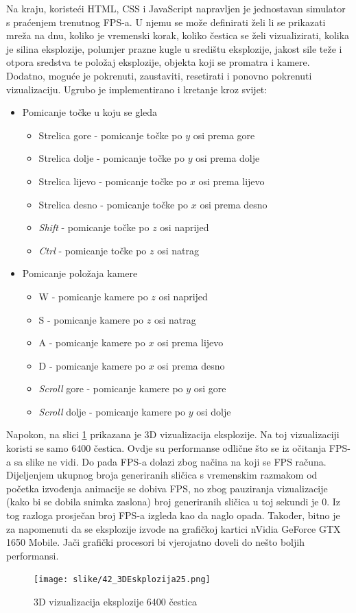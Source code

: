 \documentclass{foi}
\begin{document}
Na kraju, koristeći HTML, CSS i JavaScript napravljen je jednostavan simulator s praćenjem trenutnog FPS-a. U njemu se može definirati želi li se prikazati mreža na dnu, koliko je vremenski korak, koliko čestica se želi vizualizirati, kolika je silina eksplozije, polumjer prazne kugle u središtu eksplozije, jakost sile teže i otpora sredstva te položaj eksplozije, objekta koji se promatra i kamere. Dodatno, moguće je pokrenuti, zaustaviti, resetirati i ponovno pokrenuti vizualizaciju. Ugrubo je implementirano i kretanje kroz svijet:
\begin{itemize}
	\item Pomicanje točke u koju se gleda
	\begin{itemize}
		\item Strelica gore - pomicanje točke po $y$ osi prema gore
		\item Strelica dolje - pomicanje točke po $y$ osi prema dolje
		\item Strelica lijevo - pomicanje točke po $x$ osi prema lijevo
		\item Strelica desno - pomicanje točke po $x$ osi prema desno
		\item \textit{Shift} - pomicanje točke po $z$ osi naprijed
		\item \textit{Ctrl} - pomicanje točke po $z$ osi natrag
	\end{itemize}
	\item Pomicanje položaja kamere
	\begin{itemize}
		\item W - pomicanje kamere po $z$ osi naprijed
		\item S - pomicanje kamere po $z$ osi natrag
		\item A - pomicanje kamere po $x$ osi prema lijevo
		\item D - pomicanje kamere po $x$ osi prema desno
		\item \textit{Scroll} gore - pomicanje kamere po $y$ osi gore
		\item \textit{Scroll} dolje - pomicanje kamere po $y$ osi dolje
	\end{itemize}
	
	
\end{itemize}

Napokon, na slici \ref{fig:3D_25} prikazana je 3D vizualizacija eksplozije. Na toj vizualizaciji koristi se samo 6400 čestica. Ovdje su performanse odlične što se iz očitanja FPS-a sa slike ne vidi. Do pada FPS-a dolazi zbog načina na koji se FPS računa. Dijeljenjem ukupnog broja generiranih sličica s vremenskim razmakom od početka izvođenja animacije se dobiva FPS, no zbog pauziranja vizualizacije (kako bi se dobila snimka zaslona) broj generiranih sličica u toj sekundi je 0. Iz tog razloga prosječan broj FPS-a izgleda kao da naglo opada. Također, bitno je za napomenuti da se eksplozije izvode na grafičkoj kartici nVidia GeForce GTX 1650 Mobile. Jači grafički procesori bi vjerojatno doveli do nešto boljih performansi.
\\
\begin{figure}[H]
	\centering
	\texttt{[image: slike/42\_3DEskplozija25.png]}
	\captionsetup{justification=centering}
	\caption{3D vizualizacija eksplozije 6400 čestica}
	\label{fig:3D_25}
\end{figure}
\end{document}

